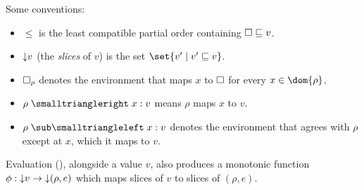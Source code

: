 

Some conventions:
\begin{itemize}
\item $\leq$ is the least compatible partial order containing $\square \sqsubseteq v$.
\item ${\downarrow}{v}$ (the \emph{slices} of $v$) is the set $\set{v' \mid v' \leq v}$.
\item $\square_\rho$ denotes the environment that maps $x$ to $\square$ for every $x \in \dom{\rho}$.
\item $\envLookup{\rho}{x}{v}$ means $\rho$ maps $x$ to $v$.
\item $\envLookupBwd{\rho}{}{\bind{x}{v}}$ denotes the environment that agrees with $\rho$ except at $x$, which it maps to $v$.
\end{itemize}

\noindent Evaluation (), alongside a value $v$, also produces a monotonic function $\phi: {\downarrow}{v} \to {\downarrow}{(\rho,e)}$ which maps slices of $v$ to slices of $(\rho,e)$.


